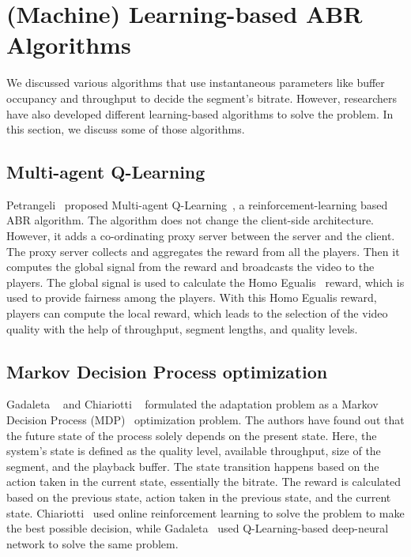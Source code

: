 \section{(Machine) Learning-based ABR Algorithms}
We discussed various algorithms that use instantaneous parameters like buffer occupancy and throughput to decide the segment's bitrate. However, researchers have also developed different learning-based algorithms to solve the problem. In this section, we discuss some of those algorithms.

\subsection{Multi-agent Q-Learning}
Petrangeli \etal\ proposed Multi-agent Q-Learning~\cite{6838245}, a reinforcement-learning based ABR algorithm. The algorithm does not change the client-side architecture. However, it adds a co-ordinating proxy server between the server and the client. The proxy server collects and aggregates the reward from all the players. Then it computes the global signal from the reward and broadcasts the video to the players. The global signal is used to calculate the Homo Egualis~\cite{10.5555/1402298.1402344} reward, which is used to provide fairness among the players. With this Homo Egualis reward, players can compute the local reward, which leads to the selection of the video quality with the help of throughput, segment lengths, and quality levels.

\subsection{Markov Decision Process optimization}
Gadaleta \etal~\cite{8048013} and Chiariotti \etal~\cite{10.1145/2910017.2910603} formulated the adaptation problem as a Markov Decision Process (MDP)~\cite{P-1066} optimization problem. The authors have found out that the future state of the process solely depends on the present state. Here, the system's state is defined as the quality level, available throughput, size of the segment, and the playback buffer. The state transition happens based on the action taken in the current state, essentially the bitrate. The reward is calculated based on the previous state, action taken in the previous state, and the current state. Chiariotti \etal\ used online reinforcement learning to solve the problem to make the best possible decision, while Gadaleta \etal\ used Q-Learning-based deep-neural network to solve the same problem.

